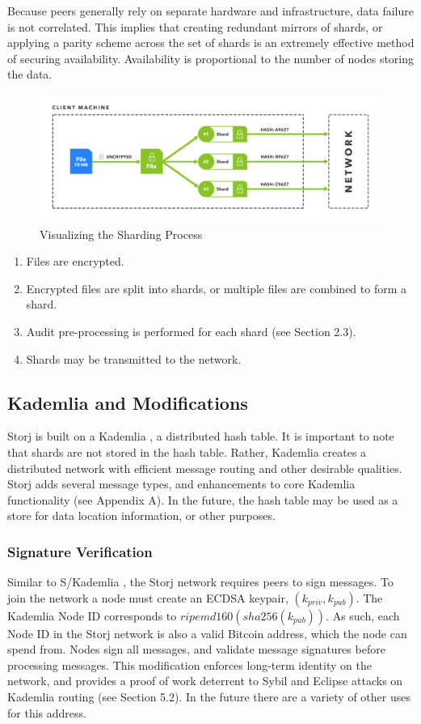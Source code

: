 \documentclass[a4paper,10pt]{article}
\begin{document}
Because peers generally rely on separate hardware and infrastructure, data failure is not correlated. This implies that creating redundant mirrors of shards, or applying a parity scheme across the set of shards is an extremely effective method of securing availability. Availability is proportional to the number of nodes storing the data.

\begin{figure}[hbt]
\centering
\includegraphics[width=\linewidth]{1}
\caption{Visualizing the Sharding Process}
\end{figure}

\begin{enumerate}
\item Files are encrypted.
\item Encrypted files are split into shards, or multiple files are combined to form a shard.
\item Audit pre-processing is performed for each shard (see Section 2.3).
\item Shards may be transmitted to the network.
\end{enumerate}

\subsection{Kademlia and Modifications}
Storj is built on a Kademlia \cite{2}, a distributed hash table. It is important to note that shards are not stored in the hash table. Rather, Kademlia creates a distributed network with efficient message routing and other desirable qualities. Storj adds several message types, and enhancements to core Kademlia functionality (see Appendix A). In the future, the hash table may be used as a store for data location information, or other purposes.

\subsubsection{Signature Verification}
Similar to S/Kademlia \cite{3}, the Storj network requires peers to sign messages. To join the network a node must create an ECDSA keypair, $ (k_{priv}, k_{pub}) $. The Kademlia Node ID corresponds to $ ripemd160(sha256(k_{pub})) $. As such, each Node ID in the Storj network is also a valid Bitcoin address, which the node can spend from. Nodes sign all messages, and validate message signatures before processing messages. This modification enforces long-term identity on the network, and provides a proof of work deterrent to Sybil and Eclipse attacks on Kademlia routing (see Section 5.2). In the future there are a variety of other uses for this address.
\end{document}
